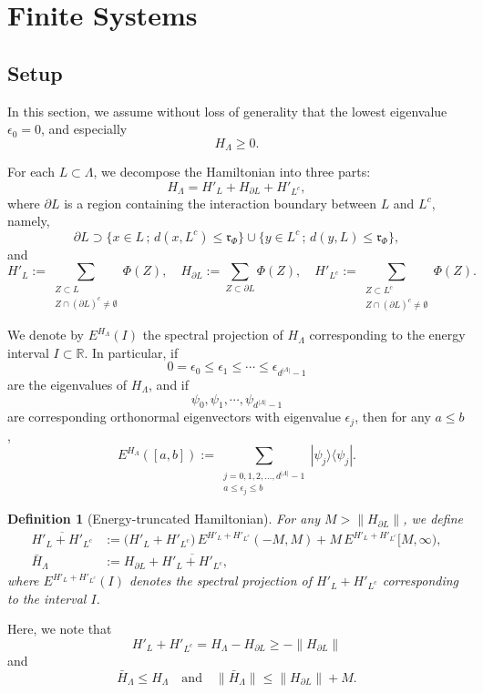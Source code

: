 \documentclass[11pt]{article}
\numberwithin{equation}{section}
\newtheorem{definition}[theorem]{Definition}
\begin{document}
\section{Finite Systems}\label{S_finite}
\subsection{Setup}
In this section, we assume without loss of generality that the lowest eigenvalue $\epsilon_0=0$, and especially
\[
H_\Lambda\geq 0.
\]

For each $L\subset\Lambda$, we decompose the Hamiltonian into three parts:
\begin{equation}\label{eq_decompose}
H_\Lambda=H'_L+H_{\partial L}+H'_{L^c},
\end{equation}
where $\partial L$ is a region containing the interaction boundary between $L$ and $L^c$, namely,
\[
\partial L\supset 
\{x\in L\,;\,d(x,L^c)\leq\mathfrak{r}_\Phi\}\cup
\{y\in L^c\,;\,d(y,L)\leq\mathfrak{r}_\Phi\},
\]
and
\[
H'_L:=\sum_{\substack{Z\subset L\\ Z\cap(\partial L)^c\neq\emptyset}}\Phi(Z),\quad
H_{\partial L}:=\sum_{Z\subset\partial L}\Phi(Z),\quad
H'_{L^c}:=\sum_{\substack{Z\subset L^c\\ Z\cap(\partial L)^c\neq\emptyset}}\Phi(Z).
\]

We denote by $E^{H_\Lambda}(I)$ the spectral projection of $H_\Lambda$ corresponding to the energy interval $I\subset\mathbb{R}$. In particular, if
\[
0=\epsilon_0\leq\epsilon_1\leq\cdots\leq\epsilon_{d^{|\Lambda|}-1}
\]
are the eigenvalues of $H_\Lambda$, and if
\[
\psi_0,\psi_1,\cdots,\psi_{d^{|\Lambda|}-1}
\]
are corresponding orthonormal eigenvectors with eigenvalue $\epsilon_j$, then for any $a\leq b$,
\[
E^{H_\Lambda}([a,b]):=
\sum_{\substack{j=0,1,2,\ldots,d^{|\Lambda|}-1\\ a\leq\epsilon_j\leq b}} |\psi_j\rangle\langle\psi_j|.
\]

\begin{definition}[Energy-truncated Hamiltonian]
For any $M>\|H_{\partial L}\|$, we define
\begin{align*}
\overline{H'_L+H'_{L^c}}
&:=\big(H'_L+H'_{L^c}\big)\,E^{H'_L+H'_{L^c}}(-M,M)
+ M\,E^{H'_L+H'_{L^c}}[M,\infty),\\
\bar{H}_\Lambda
&:=H_{\partial L}+ \overline{H'_L+H'_{L^c}},
\end{align*}
where $E^{H'_L+H'_{L^c}}(I)$ denotes the spectral projection of $H'_L+H'_{L^c}$ corresponding to the interval $I$.
\end{definition}
Here, we note that
\[
H'_L+H'_{L^c}=H_\Lambda-H_{\partial L}\geq -\|H_{\partial L}\|
\]
and
\[
\bar{H}_\Lambda\leq H_\Lambda \quad\text{and}\quad
\|\bar{H}_\Lambda\|\leq\|H_{\partial L}\|+M.
\]
\end{document}
